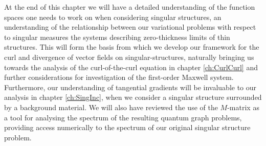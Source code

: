 At the end of this chapter we will have a detailed understanding of the function spaces one needs to work on when considering singular structures, an understanding of the relationship between our variational problems with respect to singular measures the systems describing zero-thickness limits of thin structures.
This will form the basis from which we develop our framework for the curl and divergence of vector fields on singular-structures, naturally bringing us towards the analysis of the curl-of-the-curl equation in chapter \ref{ch:CurlCurl} and further considerations for investigation of the first-order Maxwell system.
Furthermore, our understanding of tangential gradients will be invaluable to our analysis in chapter \ref{ch:SingInc}, when we consider a singular structure surrounded by a background material.
We will also have reviewed the use of the $M$-matrix as a tool for analysing the spectrum of the resulting quantum graph problems, providing access numerically to the spectrum of our original singular structure problem.